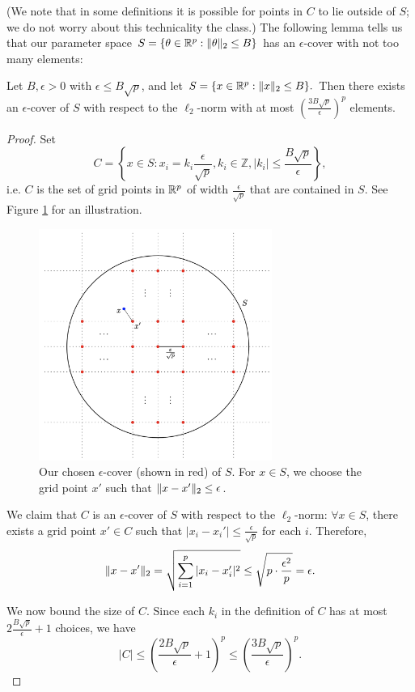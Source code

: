 (We note that in some definitions it is possible for points in $C$ to lie outside of $S$; we do not worry about this technicality the class.) The following lemma tells us that our parameter space $S = \{\theta \in \mathbb R^p: \|\theta\|_2 \le B\}$ has an $\epsilon$-cover with not too many elements:

\begin{lemma}\label{lec4:lem:ECSize}
Let $B,\epsilon>0$ with $\epsilon \le B \sqrt{p}$, and let $S = \{x \in \mathbb R^p: \|x\|_2 \le B\}.$ Then there exists an $\epsilon$-cover of $S$ with respect to the $\ell_2$-norm with at most $\left(\frac{3B\sqrt{p}}{\epsilon}\right)^p$ elements.
\end{lemma}

\begin{proof}
Set
\begin{equation}
C = \left\{ x \in S: x_i = k_i \frac{\epsilon}{\sqrt{p}}, k_i \in \mathbb{Z}, |k_i| \leq  \frac{B\sqrt{p}}{\epsilon}  \right\},
\end{equation}
i.e. $C$ is the set of grid points in $\mathbb R^p$ of width $\tfrac{\epsilon}{\sqrt{p}}$ that are contained in $S$. See Figure \ref{lec5:fig:ecover} for an illustration. 
\begin{figure}[ht]
\centerline{\includegraphics[width=3in]{figures/ECover.png}}
\caption[lec5:fig:ecover]{Our chosen $\epsilon$-cover (shown in red) of $S$. For $x \in S$, we choose the grid point $x'$ such that $\|x-x'\|_2 \le \epsilon$.}
\label{lec5:fig:ecover}
\end{figure}

We claim that $C$ is an $\epsilon$-cover of $S$ with respect to the $\ell_2$-norm: $\forall x \in S$, there exists a grid point $x' \in C$ such that $|x_i-x_i'| \le \tfrac{\epsilon}{\sqrt{p}}$ for each $i$. Therefore,
$$\|x-x'\|_2 = \sqrt{\sum_{i = 1}^p |x_i - x_i'|^2} \leq \sqrt{p\cdot \frac{\epsilon^2}{p}} = \epsilon.$$

We now bound the size of $C$. Since each $k_i$ in the definition of $C$ has at most $2\tfrac{B\sqrt{p}}{\epsilon}+1$ choices, we have 
\begin{equation}
|C| \le \left( \frac{2B\sqrt{p}}{\epsilon} +1\right)^p \le \left(\frac{3B\sqrt{p}}{\epsilon}\right)^p.
\end{equation}
\end{proof}

